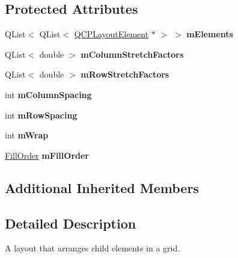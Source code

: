 \subsection*{Protected Attributes}
\begin{DoxyCompactItemize}
\item 
Q\+List$<$ Q\+List$<$ \hyperlink{classQCPLayoutElement}{Q\+C\+P\+Layout\+Element} $\ast$ $>$ $>$ {\bfseries m\+Elements}\hypertarget{classQCPLayoutGrid_a3577d3855bf8ad20ef9079291a49f397}{}\label{classQCPLayoutGrid_a3577d3855bf8ad20ef9079291a49f397}

\item 
Q\+List$<$ double $>$ {\bfseries m\+Column\+Stretch\+Factors}\hypertarget{classQCPLayoutGrid_ac6aabe62339f94f18b9f8adab94b1840}{}\label{classQCPLayoutGrid_ac6aabe62339f94f18b9f8adab94b1840}

\item 
Q\+List$<$ double $>$ {\bfseries m\+Row\+Stretch\+Factors}\hypertarget{classQCPLayoutGrid_a36c85a7eaf342680fb9b8a4977486f16}{}\label{classQCPLayoutGrid_a36c85a7eaf342680fb9b8a4977486f16}

\item 
int {\bfseries m\+Column\+Spacing}\hypertarget{classQCPLayoutGrid_ae9ac48f0791be07ead0a96dbd5622770}{}\label{classQCPLayoutGrid_ae9ac48f0791be07ead0a96dbd5622770}

\item 
int {\bfseries m\+Row\+Spacing}\hypertarget{classQCPLayoutGrid_a8b67f183f4645739cc4c794d75843b40}{}\label{classQCPLayoutGrid_a8b67f183f4645739cc4c794d75843b40}

\item 
int {\bfseries m\+Wrap}\hypertarget{classQCPLayoutGrid_a17d90c289139847f68cca9e75d64b0fd}{}\label{classQCPLayoutGrid_a17d90c289139847f68cca9e75d64b0fd}

\item 
\hyperlink{classQCPLayoutGrid_a7d49ee08773de6b2fd246edfed353cca}{Fill\+Order} {\bfseries m\+Fill\+Order}\hypertarget{classQCPLayoutGrid_a35a20072cbca5659dd75ca74eae87beb}{}\label{classQCPLayoutGrid_a35a20072cbca5659dd75ca74eae87beb}

\end{DoxyCompactItemize}
\subsection*{Additional Inherited Members}


\subsection{Detailed Description}
A layout that arranges child elements in a grid. 

